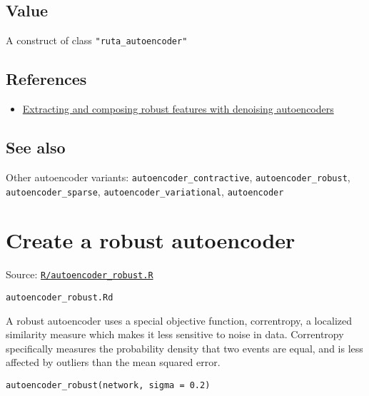 \hypertarget{value}{\subsection{\texorpdfstring{\protect\hyperlink{value}{}Value}{Value}}\label{value}}

A construct of class \texttt{"ruta\_autoencoder"}

\hypertarget{references}{\subsection{\texorpdfstring{\protect\hyperlink{references}{}References}{References}}\label{references}}

\begin{itemize}
\tightlist
\item
  \href{https://dl.acm.org/citation.cfm?id=1390294}{Extracting and
  composing robust features with denoising autoencoders}
\end{itemize}

\hypertarget{see-also}{\subsection{\texorpdfstring{\protect\hyperlink{see-also}{}See
also}{See also}}\label{see-also}}

Other autoencoder variants: \texttt{autoencoder\_contractive},
\texttt{autoencoder\_robust}, \texttt{autoencoder\_sparse},
\texttt{autoencoder\_variational}, \texttt{autoencoder}

\section{Create a robust autoencoder}\label{create-a-robust-autoencoder}

Source:
\href{https://github.com/fdavidcl/ruta/blob/master/R/autoencoder_robust.R}{\texttt{R/autoencoder\_robust.R}}

\texttt{autoencoder\_robust.Rd}

A robust autoencoder uses a special objective function, correntropy, a
localized similarity measure which makes it less sensitive to noise in
data. Correntropy specifically measures the probability density that two
events are equal, and is less affected by outliers than the mean squared
error.

\begin{verbatim}
autoencoder_robust(network, sigma = 0.2)
\end{verbatim}

